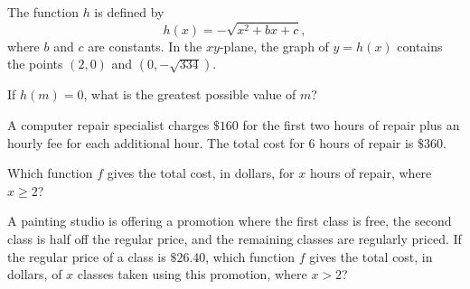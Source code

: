 \vspace{2em}
\newpage

\noindent\markforreview
\vspace{1em}

The function \(h\) is defined by
\[
h(x) = -\sqrt{x^2 + bx + c},
\]
where \(b\) and \(c\) are constants. In the \(xy\)-plane, the graph of \(y = h(x)\) contains the points \((2, 0)\) and \(\left(0, -\sqrt{334}\right)\).

If \(h(m) = 0\), what is the greatest possible value of \(m\)?

\vspace{2em}
\newpage

\noindent\markforreview
\vspace{1em}

A computer repair specialist charges \(\$160\) for the first two hours of repair plus an hourly fee for each additional hour. The total cost for \(6\) hours of repair is \(\$360\).

Which function \(f\) gives the total cost, in dollars, for \(x\) hours of repair, where \(x \geq 2\)?

\vspace{0.75em}


\vspace{2em}
\newpage

\noindent\markforreview
\vspace{1em}

A painting studio is offering a promotion where the first class is free, the second class is half off the regular price, and the remaining classes are regularly priced. If the regular price of a class is \(\$26.40\), which function \(f\) gives the total cost, in dollars, of \(x\) classes taken using this promotion, where \(x > 2\)?

\vspace{0.75em}


\vspace{2em}
\newpage

\noindent\markforreview
\vspace{1em}

